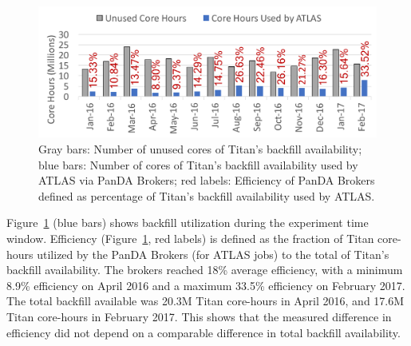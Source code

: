 \begin{figure}[htp]
    \includegraphics[clip,width=\columnwidth]{figures/backfill_consumption.pdf}
    \caption{Gray bars: Number of unused cores of Titan's backfill availability;
    blue bars: Number of cores of Titan's backfill availability used by ATLAS
    via PanDA Brokers; red labels: Efficiency of PanDA Brokers defined as
    percentage of Titan's backfill availability used by ATLAS.}
\label{fig:backfill-utilization}
\end{figure}

Figure~\ref{fig:backfill-utilization} (blue bars) shows backfill utilization
during the experiment time window. Efficiency
(Figure~\ref{fig:backfill-utilization}, red labels) is defined as the fraction
of Titan core-hours utilized by the PanDA Brokers (for ATLAS jobs) to the total
of Titan’s backfill availability. The brokers reached 18\% average efficiency,
with a minimum 8.9\% efficiency on April 2016 and a maximum 33.5\% efficiency on
February 2017.
The total backfill available was 20.3M Titan core-hours in April
2016, and 17.6M Titan core-hours in February 2017. This shows that the measured
difference in efficiency did not depend on a comparable difference in total
backfill availability.


